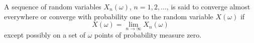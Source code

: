 A sequence of random variables $X_n(\omega)$, $n = 1, 2, \ldots$, is said to converge almost everywhere or converge with probability one to the random variable $X(\omega)$ if
$$X(\omega) = \lim_{n \to \infty} X_n(\omega)$$
except possibly on a set of $\omega$ points of probability measure zero.
